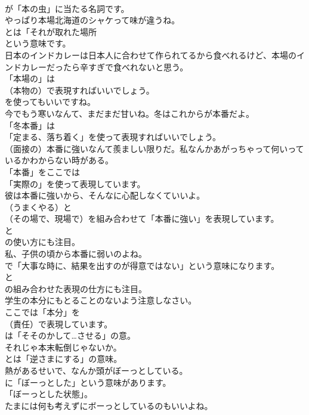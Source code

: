 \documentclass[8pt]{extreport}
\begin{document}
\begin{CJK}{UTF8}{min}
\\	が「本の虫」に当たる名詞です。	
\\	やっぱり本場北海道のシャケって味が違うね。 
\\	とは「それが取れた場所
\\	という意味です。	
\\	日本のインドカレーは日本人に合わせて作られてるから食べれるけど、本場のインドカレーだったら辛すぎで食べれないと思う。 
\\	「本場の」は 
\\	（本物の）で表現すればいいでしょう。
\\	を使ってもいいですね。	
\\	今でもう寒いなんて、まだまだ甘いね。冬はこれからが本番だよ。 
\\	「冬本番」は
\\	「定まる、落ち着く」を使って表現すればいいでしょう。	
\\	（面接の）本番に強いなんて羨ましい限りだ。私なんかあがっちゃって何いっているかわからない時がある。 
\\	「本番」をここでは
\\	「実際の」を使って表現しています。	
\\	彼は本番に強いから、そんなに心配しなくていいよ。 
\\	（うまくやる）と
\\	（その場で、現場で）を組み合わせて「本番に強い」を表現しています。
\\	と 
\\	の使い方にも注目。	
\\	私、子供の頃から本番に弱いのよね。 
\\	で「大事な時に、結果を出すのが得意ではない」という意味になります。
\\	と
\\	の組み合わせた表現の仕方にも注目。	
\\	学生の本分にもとることのないよう注意しなさい。 
\\	ここでは「本分」を 
\\	（責任）で表現しています。
\\	は「そそのかして…させる」の意。	
\\	それじゃ本末転倒じゃないか。 
\\	とは「逆さまにする」の意味。	
\\	熱があるせいで、なんか頭がぼーっとしている。 
\\	に「ぼーっとした」という意味があります。
\\	「ぼーっとした状態」。	
\\	たまには何も考えずにボーっとしているのもいいよね。 

\end{CJK}
\end{document}
